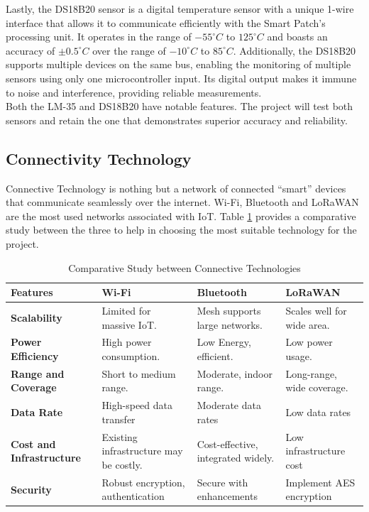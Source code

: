 \noindent Lastly, the DS18B20 sensor is a digital temperature sensor with a unique 1-wire interface that allows it to communicate efficiently with the Smart Patch's processing unit. It operates in the range of \(-55^\circ C\) to \(125^\circ C\) and boasts an accuracy of \(\pm0.5^\circ C\) over the range of \(-10^\circ C\) to \(85^\circ C\). Additionally, the DS18B20 supports multiple devices on the same bus, enabling the monitoring of multiple sensors using only one microcontroller input. Its digital output makes it immune to noise and interference, providing reliable measurements. \\

\noindent Both the LM-35 and DS18B20 have notable features. The project will test both sensors and retain the one that demonstrates superior accuracy and reliability.

\subsection{Connectivity Technology}
Connective Technology is nothing but a network of connected “smart” devices that communicate seamlessly over the internet. Wi-Fi, Bluetooth and LoRaWAN are the most used networks associated with IoT. Table \ref{table:connective-technology} provides a comparative study between the three to help in choosing the most suitable technology for the project.\\
\begin{table}[h]
    \centering
    \begin{tabularx}{\textwidth}{|X|X|X|X|}
        \hline
        \textbf{Features} & \textbf{Wi-Fi} & \textbf{Bluetooth} & \textbf{LoRaWAN} \\ \hline
        \textbf{Scalability} & Limited for massive IoT. & Mesh supports large networks. & Scales well for wide area. \\ \hline
        \textbf{Power Efficiency} &  High power consumption.& Low Energy, efficient. & Low power usage. \\ \hline
        \textbf{Range and Coverage} & Short to medium range.&Moderate, indoor range.&Long-range, wide coverage. \\ \hline
        \textbf{Data Rate} & High-speed data transfer & Moderate data rates & Low data rates \\ \hline
        \textbf{Cost and Infrastructure} & Existing infrastructure may be costly. & Cost-effective, integrated widely. & Low infrastructure cost\\ \hline
        \textbf{Security} & Robust encryption, authentication & Secure with enhancements& Implement AES encryption \\ \hline
    \end{tabularx}
    \caption{Comparative Study between Connective Technologies}
    \label{table:connective-technology}
\end{table}


